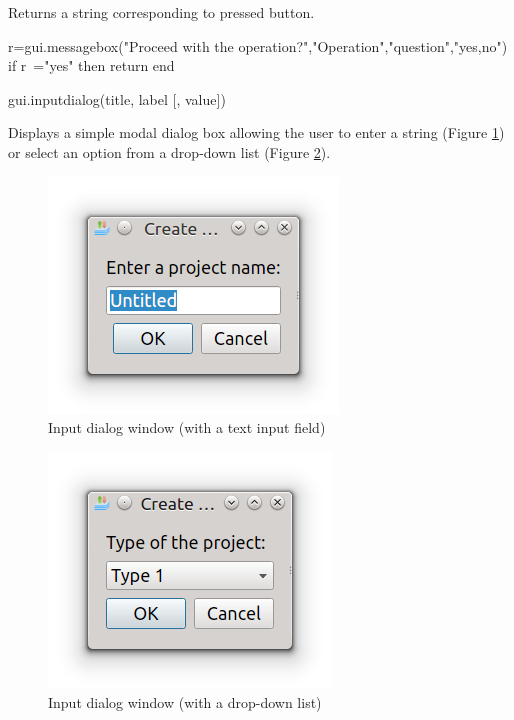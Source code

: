 \documentclass[a4paper,12pt,twoside,extrafontsizes]{memoir}
\begin{document}
\begin{funcret}
	Returns a string corresponding to pressed button.
\end{funcret}

\begin{funcexamples}
\begin{shellcmds}\begin{luacode}
r=gui.messagebox("Proceed with the operation?","Operation","question","yes,no")
if r~="yes" then return end
\end{luacode}\end{shellcmds}
\end{funcexamples}


\begin{luafuncprototype}
gui.inputdialog(title, label [, value])
\end{luafuncprototype}

\begin{funcdescr}
	Displays a simple modal dialog box allowing the user to enter a string (Figure \ref{fig:inputdialog1}) or select an option from a drop-down list (Figure \ref{fig:inputdialog2}).
\end{funcdescr}

\begin{figure}[htbp]
\centering
\includegraphics{images/inputdialog1.png}
\caption{Input dialog window (with a text input field)}
\label{fig:inputdialog1}
\end{figure}

\begin{figure}[htbp]
\centering
\includegraphics{images/inputdialog2.png}
\caption{Input dialog window (with a drop-down list)}
\label{fig:inputdialog2}
\end{figure}
\end{document}
